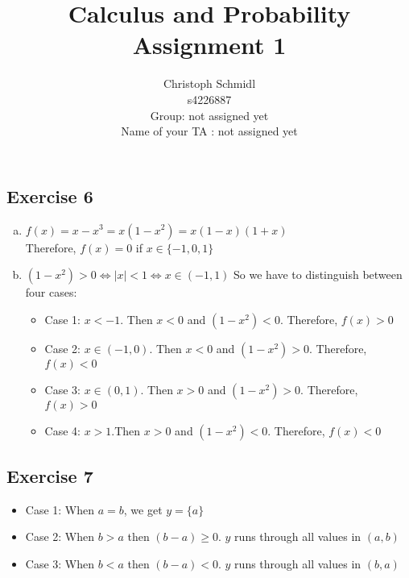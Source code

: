 \documentclass[a4paper]{article}
\title{Calculus and Probability\\Assignment 1}
\author{
 Christoph Schmidl  %
 \\ 
 s4226887  %
 \\
 Group: not assigned yet  %
 \\
 Name of your TA : not assigned yet %
}
\newcommand{\exercise}[2]{\subsection*{Exercise #1}{#2}}
\newcommand{\exerciseenum}[2]{\subsection*{Exercise #1}{\begin{enumerate}[a)]#2\end{enumerate}}}
\begin{document}
\maketitle 




%
%

\exerciseenum{6}{%
\item%
$f(x) = x - x^3 = x(1-x^2)= x(1-x)(1+x)$\\
Therefore, $f(x) = 0$ if $x \in \{ -1,0,1 \}$



\item%
$(1-x^2) > 0 \Leftrightarrow |x| < 1 \Leftrightarrow x \in (-1,1)$ So we have to distinguish between four cases:

\begin{itemize}
	\item Case 1: $x < -1$. Then $x < 0$ and $(1-x^2) < 0$. Therefore, $f(x) > 0$
	\item Case 2: $x \in (-1,0)$. Then $x < 0$ and $(1-x^2) > 0$. Therefore, $f(x) < 0$
	\item Case 3: $x \in (0,1)$. Then $x > 0$ and $(1-x^2) > 0$. Therefore, $f(x) > 0$
	\item Case 4: $x > 1$.Then $x > 0$ and $(1-x^2) < 0$. Therefore, $f(x) < 0$
\end{itemize}


}

\exercise{7}{%
\begin{itemize}
	\item Case 1: When $a = b$, we get $y = \{ a \}$
	\item Case 2: When $b > a$ then $(b-a) \geq 0$. $y$ runs through all values in $(a,b)$
	\item Case 3: When $b < a$ then $(b-a) < 0$. $y$ runs through all values in $(b,a)$
\end{itemize}
}
\end{document}
